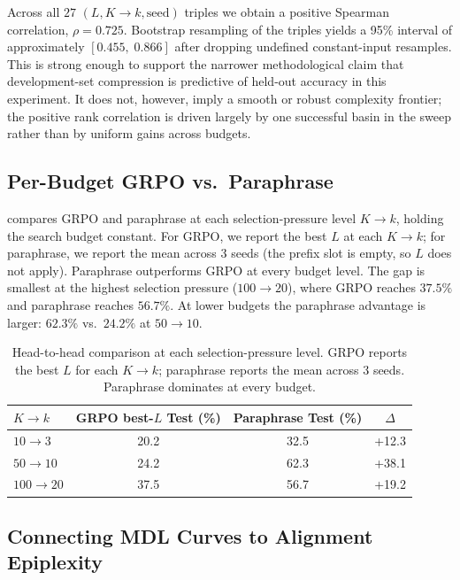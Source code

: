 \documentclass[preprint]{article}
\begin{document}
Across all $27$ $(L, K{\to}k, \text{seed})$ triples we obtain a positive Spearman correlation, $\rho = 0.725$.
Bootstrap resampling of the triples yields a 95\% interval of approximately $[0.455,\;0.866]$ after dropping undefined constant-input resamples.
This is strong enough to support the narrower methodological claim that development-set compression is predictive of held-out accuracy in this experiment.
It does not, however, imply a smooth or robust complexity frontier; the positive rank correlation is driven largely by one successful basin in the sweep rather than by uniform gains across budgets.

\subsection{Per-Budget GRPO vs.\ Paraphrase}
\label{sec:per_budget}

 compares GRPO and paraphrase at each selection-pressure level $K{\to}k$, holding the search budget constant.
For GRPO, we report the best $L$ at each $K{\to}k$; for paraphrase, we report the mean across 3 seeds (the prefix slot is empty, so $L$ does not apply).
Paraphrase outperforms GRPO at every budget level.
The gap is smallest at the highest selection pressure ($100{\to}20$), where GRPO reaches $37.5\%$ and paraphrase reaches $56.7\%$.
At lower budgets the paraphrase advantage is larger: $62.3\%$ vs.\ $24.2\%$ at $50{\to}10$.

\begin{table}[t]
\centering
\caption{Head-to-head comparison at each selection-pressure level. GRPO reports the best $L$ for each $K{\to}k$; paraphrase reports the mean across 3 seeds. Paraphrase dominates at every budget.}
\label{tab:per_budget}
\small
\begin{tabular}{lccc}
\toprule
$K{\to}k$ & GRPO best-$L$ Test (\%) & Paraphrase Test (\%) & $\Delta$ \\
\midrule
$10{\to}3$ & 20.2 & 32.5 & +12.3 \\
$50{\to}10$ & 24.2 & 62.3 & +38.1 \\
$100{\to}20$ & 37.5 & 56.7 & +19.2 \\
\bottomrule
\end{tabular}
\end{table}

\subsection{Connecting MDL Curves to Alignment Epiplexity}
\label{sec:connecting_epiplexity}
\end{document}
